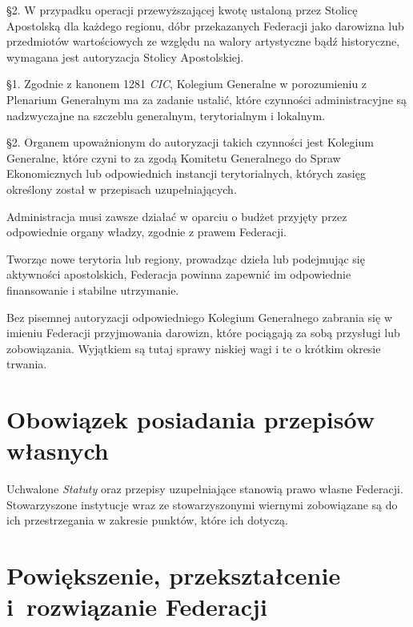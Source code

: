 \S{}2. W przypadku operacji przewyższającej kwotę ustaloną przez Stolicę Apostolską dla każdego regionu, dóbr przekazanych Federacji jako darowizna lub przedmiotów wartościowych ze względu na walory artystyczne bądź historyczne, wymagana jest autoryzacja Stolicy Apostolskiej.




 \S{}1. Zgodnie z kanonem 1281  {\em CIC}, Kolegium Generalne w porozumieniu z Plenarium Generalnym ma za zadanie ustalić, które czynności administracyjne są nadzwyczajne na szczeblu generalnym, terytorialnym i lokalnym.


\S{}2. Organem upoważnionym do autoryzacji takich czynności jest Kolegium Generalne, które czyni to za zgodą Komitetu Generalnego do Spraw Ekonomicznych lub odpowiednich instancji terytorialnych, których zasięg określony został w przepisach uzupełniających.
 


 Administracja musi zawsze działać w oparciu o budżet przyjęty przez odpowiednie organy władzy, zgodnie z prawem Federacji.
 


 Tworząc nowe terytoria lub regiony, prowadząc dzieła lub podejmując się aktywności apostolskich, Federacja powinna zapewnić im odpowiednie finansowanie i stabilne utrzymanie.
 
\filbreak{}

 Bez pisemnej autoryzacji odpowiedniego Kolegium Generalnego zabrania się w imieniu Federacji przyjmowania darowizn, które pociągają za sobą przysługi lub zobowiązania. Wyjątkiem są tutaj sprawy niskiej wagi i te o krótkim okresie trwania.






\chapter{Obowiązek posiadania przepisów własnych}


 Uchwalone {\em Statuty} oraz przepisy uzupełniające stanowią prawo własne Federacji. Stowarzyszone instytucje wraz ze stowarzyszonymi wiernymi zobowiązane są do ich przestrzegania w zakresie punktów, które ich dotyczą.


\chapter{Powiększenie, przekształcenie \mbox{i rozwiązanie} Federacji}


